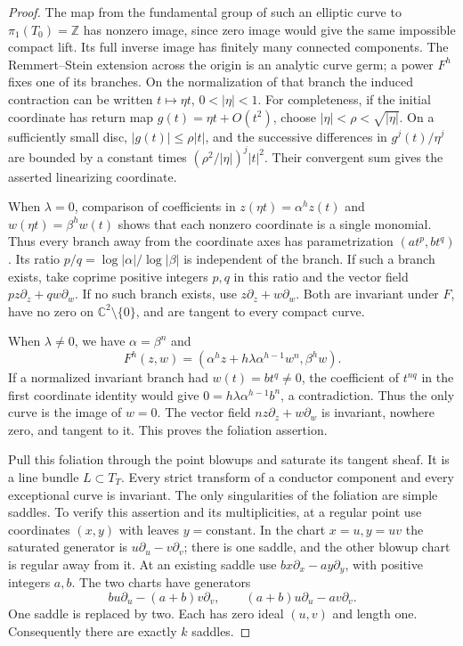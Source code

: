 \begin{proof}
The map from the fundamental group of such an
elliptic curve to $\pi_1(T_0)=\mathbb Z$ has
nonzero image, since zero image would give the
same impossible compact lift. Its full inverse
image has finitely many connected components.
The Remmert--Stein extension across the origin
is an analytic curve germ; a power $F^h$ fixes
one of its branches. On the normalization of
that branch the induced contraction can be
written $t\mapsto\eta t$, $0<|\eta|<1$.
For completeness, if the initial coordinate
has return map $g(t)=\eta t+O(t^2)$, choose
$|\eta|<\rho<\sqrt{|\eta|}$. On a sufficiently
small disc, $|g(t)|\le\rho|t|$, and the
successive differences in $g^j(t)/\eta^j$
are bounded by a constant times
$(\rho^2/|\eta|)^j|t|^2$. Their convergent sum
gives the asserted linearizing coordinate.

When $\lambda=0$, comparison of coefficients in
$z(\eta t)=\alpha^h z(t)$ and
$w(\eta t)=\beta^h w(t)$ shows that each
nonzero coordinate is a single monomial.
Thus every branch away from the coordinate axes
has parametrization $(a t^p,b t^q)$. Its ratio
$p/q=\log|\alpha|/\log|\beta|$ is independent
of the branch. If such a branch exists, take
coprime positive integers $p,q$ in this ratio
and the vector field
$p z\partial_z+q w\partial_w$.
If no such branch exists, use
$z\partial_z+w\partial_w$.
Both are invariant under $F$, have no zero on
$\mathbb C^2\setminus\{0\}$, and are tangent
to every compact curve.

When $\lambda\ne0$, we have $\alpha=\beta^n$ and
\[
 F^h(z,w)=
 (\alpha^h z+h\lambda\alpha^{h-1}w^n,\beta^h w).
\]
If a normalized invariant branch had
$w(t)=b t^q\ne0$, the coefficient of $t^{nq}$
in the first coordinate identity would give
$0=h\lambda\alpha^{h-1}b^n$, a contradiction.
Thus the only curve is the image of $w=0$.
The vector field $n z\partial_z+w\partial_w$
is invariant, nowhere zero, and tangent to it.
This proves the foliation assertion.

Pull this foliation through the point blowups
and saturate its tangent sheaf. It is a line
bundle $L\subset T_T$. Every strict transform
of a conductor component and every exceptional
curve is invariant. The only singularities of
the foliation are simple saddles. To verify
this assertion and its multiplicities, at a
regular point use coordinates $(x,y)$ with
leaves $y=\text{constant}$. In the chart
$x=u,y=uv$ the saturated generator is
$u\partial_u-v\partial_v$; there is one
saddle, and the other blowup chart is regular
away from it. At an existing saddle use
$b x\partial_x-a y\partial_y$, with positive
integers $a,b$. The two charts have generators
\[
 b u\partial_u-(a+b)v\partial_v,\qquad
 (a+b)u\partial_u-a v\partial_v.
\]
One saddle is replaced by two. Each has
zero ideal $(u,v)$ and length one.
Consequently there are exactly $k$ saddles.


\end{proof}
